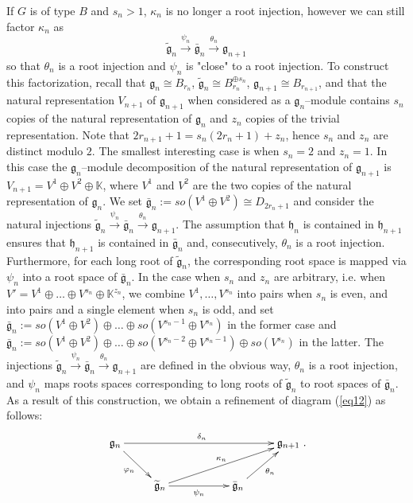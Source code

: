 \documentclass[12pt]{amsart}
\def\gg{\mathfrak{g}}
\def\gh{\mathfrak{h}}
\def\K{\mathbb{K}}
\theoremstyle{remark}
\begin{document}
If $G$ is of type $B$ and $s_n >1$, $\kappa_{n}$ is no longer a root injection, however
we can still factor $\kappa_{n}$ as
$$
\widetilde{\gg}_{n} \stackrel{\psi_{n}}{\longrightarrow}  \bar{\gg}_{n} \stackrel{\theta_{n}}{\longrightarrow}  \gg_{n+1} 
$$
so that $\theta_{n}$ is a root injection and $\psi_{n}$ is "close" to a root injection. To construct this factorization,
recall that  $\gg_n \cong B_{r_n}$, $\widetilde{\gg}_{n} \cong B_{r_n}^{\oplus {s_n}}$, 
$\gg_{n+1} \cong B_{r_{n+1}}$, and  that the natural representation $V_{n+1}$ of $\gg_{n+1}$
when considered as a $\gg_n$--module contains $s_n$ copies of the natural representation of $\gg_n$ and $z_n$ copies of the trivial
representation. Note that $2r_{n+1}+1 = s_n(2r_n+1) + z_n$, hence $s_n$ and $z_n$ are distinct modulo $2$. The smallest
interesting case is when $s_n=2$ and $z_n=1$. In this case the $\gg_n$--module decomposition of the
natural representation of $\gg_{n+1}$ is $V_{n+1} = V^1 \oplus V^2 \oplus \K$, where $V^1$ and $V^2$ are the two copies of the natural
representation of $\gg_n$. We set $\bar{\gg}_n := so(V^1 \oplus V^2) \cong D_{2r_n+1}$ and consider the natural
injections $\widetilde{\gg}_n  \stackrel{\psi_n}{\to} \bar{\gg}_n  \stackrel{\theta_n}{\to} \gg_{n+1}$. 
The assumption that $\gh_n$ is contained in $\gh_{n+1}$ 
 ensures that $\gh_{n+1}$ is contained in $\bar{\gg}_n$
and, consecutively, $\theta_n$ is a root injection. Furthermore, for each long root of $\widetilde{\gg}_n$,
the corresponding root space is mapped via $\psi_n$ into a root space of $\bar{\gg}_n$. 
In the case when $s_n$ and $z_n$ are arbitrary,
i.e. when $V' = V^1 \oplus \ldots \oplus V^{s_n} \oplus \K^{z_n}$, we combine $V^1, \ldots, V^{s_n}$ into pairs when 
$s_n$ is even, and into pairs and a
single element when $s_n$ is odd, and set 
$\bar{\gg}_n := so(V^1 \oplus V^2) \oplus \ldots \oplus so(V^{s_n-1} \oplus V^{s_n})$ in the former case
and $\bar{\gg}_n := so(V^1 \oplus V^2) \oplus \ldots \oplus so(V^{s_n-2} \oplus V^{s_n-1}) \oplus so(V^{s_n})$ in the latter. 
The injections $\widetilde{\gg}_n  \stackrel{\psi_n}{\to} \bar{\gg}_n  \stackrel{\theta_n}{\to} \gg_{n+1}$ are
defined in the obvious way, $\theta_n$ is a root injection, and $\psi_n$ maps roots spaces corresponding to long roots of
$\widetilde{\gg}_n$ to root spaces of $\bar{\gg}_n$. As a result of this construction, we obtain a refinement of
diagram (\ref{eq12}) as follows:
\begin{equation} \label{eq13}
\xymatrix{
\gg_n  \ar[rrrr]^{\delta_{n}} \ar[dr]_{\varphi_{n}}  & && &\gg_{n+1} \\
& \widetilde{\gg}_{n} \ar[rr]_{\psi_{n}} \ar[rrru]^{\kappa_{n}}&& \bar{\gg}_{n}
\ar[ur]_{\theta_{n}} &}.
\end{equation}
\end{document}
